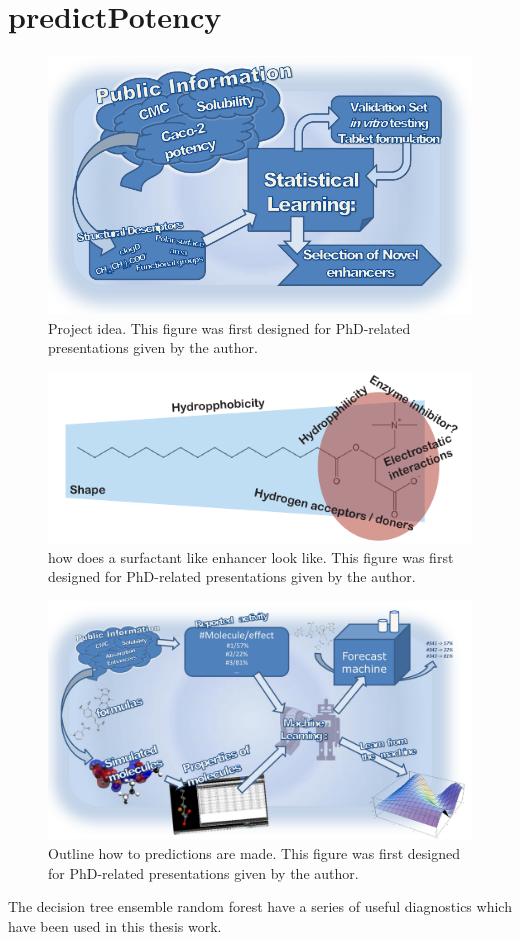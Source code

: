 \chapter{predictPotency}


\begin{figure}[ht]
\label{devel_fassif}
\includegraphics{graphics/workSummary_130mm.pdf}
\caption{Project idea. This figure was first designed for PhD-related presentations given by the author.}
\end{figure}


\begin{figure}[ht]
\label{devel_fassif}
\includegraphics{graphics/typeOfSurfactant.pdf}
\caption{how does a surfactant like enhancer look like. This figure was first designed for PhD-related presentations given by the author.}
\end{figure}

\begin{figure}[ht]
\label{devel_fassif}
\includegraphics[width=\textwidth, height=\textheight, keepaspectratio]{graphics/predictPotencySummary.pdf}
\caption{Outline how to predictions are made. This figure was first designed for PhD-related presentations given by the author.}
\end{figure}

The decision tree ensemble random forest have a series of useful diagnostics which have been used in this thesis work.

\newpage



